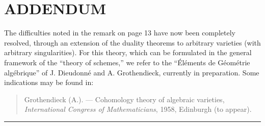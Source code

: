 \section*{ADDENDUM}

The difficulties noted in the remark on page 13 have now been completely
resolved, through an extension of the duality theorems to arbitrary varieties
(with arbitrary singularities). For this theory, which can be formulated in
the general framework of the “theory of schemes,” we refer to the
“Éléments de Géométrie algébrique” of J. Dieudonné and A. Grothendieck,
currently in preparation. Some indications may be found in:

\begin{quote}
Grothendieck (A.). --- Cohomology theory of algebraic varieties,
\emph{International Congress of Mathematicians}, 1958, Edinburgh (to appear).
\end{quote}

\begin{flushright}
[April 1959]
\end{flushright}

\begin{center}\rule{36mm}{0.5pt}\end{center}

\par\smallskip
\begingroup\footnotesize
\endgroup
